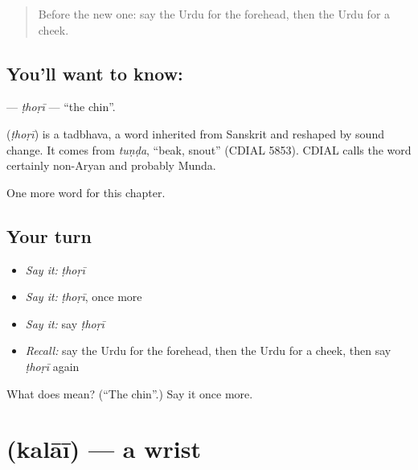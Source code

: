 \label{lesson:UR-C129-thori}



\begin{quote}
Before the new one: say the Urdu for the forehead, then the Urdu for a cheek.
\end{quote}

\subsection*{You'll want to know: }
\textbf{} — \emph{ṭhoṛī} — \textquotedblleft{}the chin\textquotedblright{}.

\begin{cousinweb}
\textbf{} (\emph{ṭhoṛī}) is a tadbhava, a word inherited from Sanskrit and reshaped by sound change. It comes from \emph{tuṇḍa}, \textquotedblleft{}beak, snout\textquotedblright{} (CDIAL 5853). CDIAL calls the word certainly non-Aryan and probably Munda.
\end{cousinweb}

\begin{grammarlens}[title={What you've built}]
One more word for this chapter.
\end{grammarlens}

\subsection*{Your turn}
\begin{itemize}
\raggedright
  \item \emph{Say it:} \emph{ṭhoṛī}
  \item \emph{Say it:} \emph{ṭhoṛī}, once more
  \item \emph{Say it:} say \emph{ṭhoṛī}
  \item \emph{Recall:} say the Urdu for the forehead, then the Urdu for a cheek, then say \emph{ṭhoṛī} again
\end{itemize}

\begin{tcolorbox}[breakable,colback=teal!4,colframe=teal!35!black,title={Before you move on}]
What does  mean? (\textquotedblleft{}The chin\textquotedblright{}.) Say it once more.
\end{tcolorbox}
\section[\texorpdfstring{\ur{کلائی} (kalāī)}{کلائی (kalāī)}]{ (kalāī) — a wrist}

